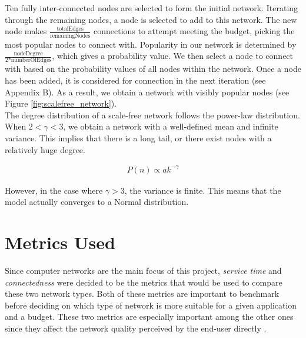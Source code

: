 \documentclass[journal]{IEEEtran}
\begin{document}
\noindent Ten fully inter-connected nodes are selected to form the initial network. Iterating through the remaining nodes, a node is selected to add to this network. The new node makes $\frac{\text{totalEdges}}{\text{remainingNodes}}$ connections to attempt meeting the budget, picking the most popular nodes to connect with. Popularity in our network is determined by $\frac{\text{nodeDegree}}{\text{2*numberOfEdges}}$, which gives a probability value. We then select a node to connect with based on the probability values of all nodes within the network. Once a node has been added, it is considered for connection in the next iteration (see Appendix B). As a result, we obtain a network with visibly popular nodes (see Figure \ref{fig:scalefree_network}). \\

\noindent The degree distribution of a scale-free network follows the power-law distribution. When $ 2 < \gamma < 3$, we obtain a network with a well-defined mean and infinite variance. This implies that there is a long tail, or there exist nodes with a relatively huge degree.

\begin{equation}
    \begin{split}
        P(n) \propto ak^{-\gamma}
    \end{split}
    \label{eq:poisson_distribution}
\end{equation}


\noindent However, in the case where $\gamma > 3$, the variance is finite. This means that the model actually converges to a Normal distribution. 


\section{Metrics Used}
\noindent Since computer networks are the main focus of this project, \textit{service time} and \textit{connectedness} were decided to be the metrics that would be used to compare these two network types. Both of these metrics are important to benchmark before deciding on which type of network is more suitable for a given application and a budget. These two metrics are especially important among the other ones since they affect the network quality perceived by the end-user directly \cite{Yamamoto_Beerends}.
\end{document}
